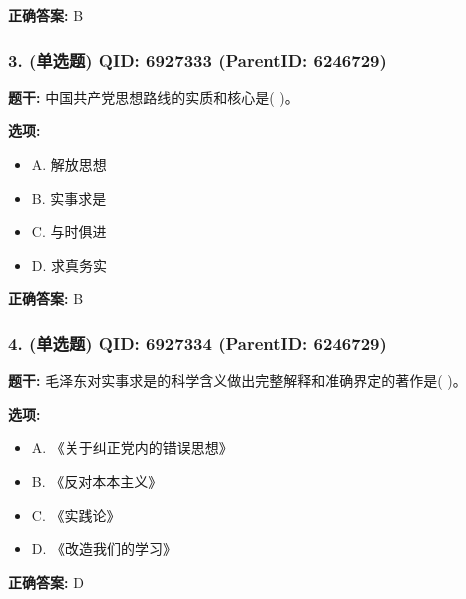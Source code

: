 \documentclass[12pt,UTF8]{ctexart}
\begin{document}
\textbf{正确答案:}
B

\vspace{0.3em}\hrulefill\vspace{0.7em}

\subsubsection*{3. (单选题) \small QID: 6927333 (ParentID: 6246729)}

\textbf{题干:}
中国共产党思想路线的实质和核心是(   )。



\textbf{选项:}
\begin{itemize}[leftmargin=*]

  \item A. 解放思想

  \item B. 实事求是

  \item C. 与时俱进

  \item D. 求真务实

\end{itemize}

\textbf{正确答案:}
B

\vspace{0.3em}\hrulefill\vspace{0.7em}

\subsubsection*{4. (单选题) \small QID: 6927334 (ParentID: 6246729)}

\textbf{题干:}
毛泽东对实事求是的科学含义做出完整解释和准确界定的著作是(   )。



\textbf{选项:}
\begin{itemize}[leftmargin=*]

  \item A. 《关于纠正党内的错误思想》

  \item B. 《反对本本主义》

  \item C. 《实践论》

  \item D. 《改造我们的学习》

\end{itemize}

\textbf{正确答案:}
D
\end{document}
